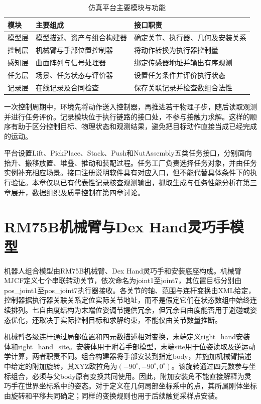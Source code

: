 \begin{table}[htbp]
  \centering\small
  \caption{仿真平台主要模块与功能}
  \label{tab:ch02_modules}
  \begin{tabular}{p{}p{}p{}}
    \hline
    模块 & 主要组成 & 接口职责\\
    \hline
    模型层 & 模型描述、资产与组合构建器 & 确定关节、执行器、几何及安装关系\\
    控制层 & 机械臂与手部位置控制器 & 将动作转换为执行器控制量\\
    感知层 & 曲面阵列与信号处理器 & 绑定传感器地址并输出有序观测\\
    任务层 & 场景、任务状态与评价器 & 设置任务条件并评价执行状态\\
    记录层 & 在线记录及合同检查 & 保存关联记录并检查数组合法性\\
    \hline
  \end{tabular}
\end{table}

一次控制周期中，环境先将动作送入控制器，再推进若干物理子步，随后读取观测并进行任务评价。记录模块位于执行链路的接口处，不参与接触力求解。这样的顺序有助于区分控制目标、物理状态和观测结果，避免把目标动作直接当成已经完成的运动。

平台设置Lift、PickPlace、Stack、Push和NutAssembly五类任务接口，分别面向抬升、搬移放置、堆叠、推动和装配过程。任务工厂负责选择任务对象，并由任务实例补充相应场景。接口注册说明软件具有对应入口，但不能代替具体条件下的执行验证。本章仅以已有代表性记录核查观测输出，抓取生成与任务性能分析在第三章展开，数据组织及质量控制在第四章讨论。

\section{RM75B机械臂与Dex Hand灵巧手模型}
\label{sec:robot_model}

机器人组合模型由RM75B机械臂、Dex Hand灵巧手和安装底座构成。机械臂MJCF定义七个串联转动关节，依次命名为joint1至joint7，其位置目标分别由pos\_joint1至pos\_joint7执行器接收。各关节的轴、范围与连杆变换由XML给定，控制器据执行器关联关系定位实际关节地址，而不是假定它们在状态数组中始终连续排列。七自由度结构为末端位姿调节提供冗余，但冗余自由度能否用于避碰或姿态优化，还取决于实际控制目标和求解约束，不能仅由关节数量推断。

机械臂各级连杆通过局部位置和四元数描述相对变换，末端定义right\_hand安装体和right\_hand\_site。安装体用于附着手部模型，末端site用于位姿读取及逆运动学计算，两者职责不同。组合构建器将手部安装到指定body，并施加机械臂描述中给定的附加旋转，其XYZ欧拉角为$(-90^\circ,-90^\circ,0^\circ)$。该旋转通过四元数参与坐标组合，必须与父body原有变换共同使用。因此，附加安装角不能直接解释为灵巧手在世界坐标系中的姿态。对于定义在几何局部坐标系中的点，其所属刚体坐标由旋转和平移共同确定；同样的变换规则也用于后续触觉采样点安装。

